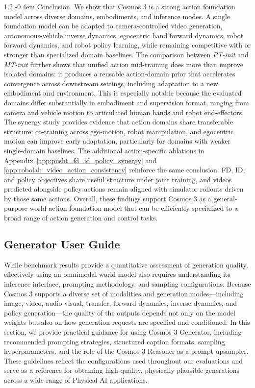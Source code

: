 \documentclass{llmxive}
\makeatletter
\providecommand{\paragraph}{  \@startsection{paragraph}{4}{\z@}    {1\baselineskip \@plus .2\baselineskip}    {-0.4em}    {\normalfont\normalsize\bfseries}}
\makeatother
\begin{document}
\paragraph{Conclusion.}
\label{sec:action_exp_summary}
We show that Cosmos 3 is a strong action foundation model across diverse domains, embodiments, and inference modes.
A single foundation model can be adapted to camera-controlled video generation, autonomous-vehicle inverse dynamics, egocentric hand forward dynamics, robot forward dynamics, and robot policy learning, while remaining competitive with or stronger than specialized domain baselines.
The comparison between \textit{PT-init} and \textit{MT-init} further shows that unified action mid-training does more than improve isolated domains: it produces a reusable action-domain prior that accelerates convergence across downstream settings, including adaptation to a new embodiment and environment.
This is especially notable because the evaluated domains differ substantially in embodiment and supervision format, ranging from camera and vehicle motion to articulated human hands and robot end-effectors.
The synergy study provides evidence that action domains share transferable structure: co-training across ego-motion, robot manipulation, and egocentric motion can improve early adaptation, particularly for domains with weaker single-domain baselines.
The additional action-specific ablations in Appendix~\ref{app:pusht_fd_id_policy_synergy} and \ref{app:robolab_video_action_consistency} reinforce the same conclusion: FD, ID, and policy objectives share useful structure under joint training, and videos predicted alongside policy actions remain aligned with simulator rollouts driven by those same actions.
Overall, these findings support Cosmos 3 as a general-purpose world-action foundation model that can be efficiently specialized to a broad range of action generation and control tasks.

\FloatBarrier

\subsection{Generator User Guide}

While benchmark results provide a quantitative assessment of generation quality, effectively using an omnimodal world model also requires understanding its inference interface, prompting methodology, and sampling configurations. Because Cosmos 3 supports a diverse set of modalities and generation modes—including image, video, audio-visual, transfer, forward-dynamics, inverse-dynamics, and policy generation—the quality of the outputs depends not only on the model weights but also on how generation requests are specified and conditioned. In this section, we provide practical guidance for using Cosmos 3 Generator, including recommended prompting strategies, structured caption formats, sampling hyperparameters, and the role of the Cosmos 3 Reasoner as a prompt upsampler. These guidelines reflect the configurations used throughout our evaluations and serve as a reference for obtaining high-quality, physically plausible generations across a wide range of Physical AI applications.
\end{document}
